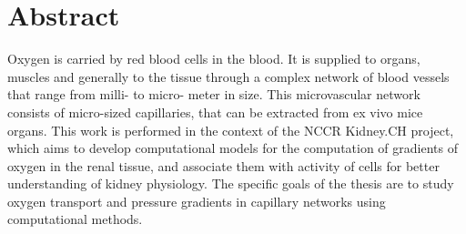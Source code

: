 \section*{Abstract}

Oxygen is carried by red blood cells in the blood. It is supplied to organs, muscles and generally to the tissue through a complex network of blood vessels that range from milli- to micro- meter in size. This microvascular network consists of micro-sized capillaries, that can be extracted from ex vivo mice organs. This work is performed in the context of the NCCR Kidney.CH project, which aims to develop computational models for the computation of gradients of oxygen in the renal tissue, and associate them with activity of cells for better understanding of kidney physiology. The specific goals of the thesis are to study oxygen transport and pressure gradients in capillary networks using computational methods.